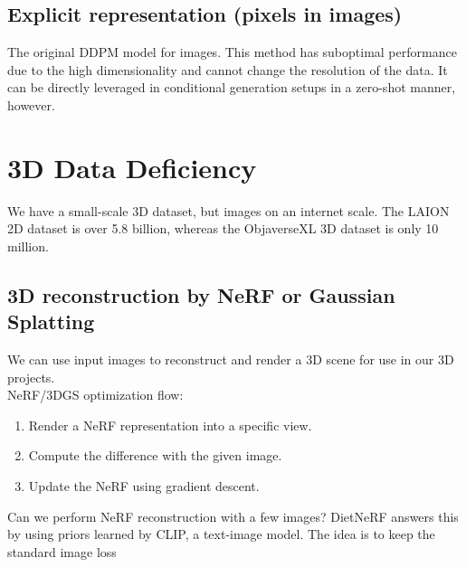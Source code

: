 \subsection{Explicit representation (pixels in images)}
The original DDPM model for images. This method has suboptimal performance due to the high dimensionality and cannot change the resolution of the data. It can be directly leveraged in conditional generation setups in a zero-shot manner, however. 

\section{3D Data Deficiency}
We have a small-scale 3D dataset, but images on an internet scale. The LAION 2D dataset is over 5.8 billion, whereas the ObjaverseXL 3D dataset is only 10 million.
\subsection{3D reconstruction by NeRF or Gaussian Splatting}
We can use input images to reconstruct and render a 3D scene for use in our 3D projects. \\ 

\noindent NeRF/3DGS optimization flow:
\begin{enumerate}[label=(\roman*), topsep=5pt, itemsep=1pt]
  \item Render a NeRF representation into a specific view.
  \item Compute the difference with the given image.
  \item Update the NeRF using gradient descent.
\end{enumerate}

Can we perform NeRF reconstruction with a few images? DietNeRF answers this by using priors learned by CLIP, a text-image model. The idea is to keep the standard image loss 
